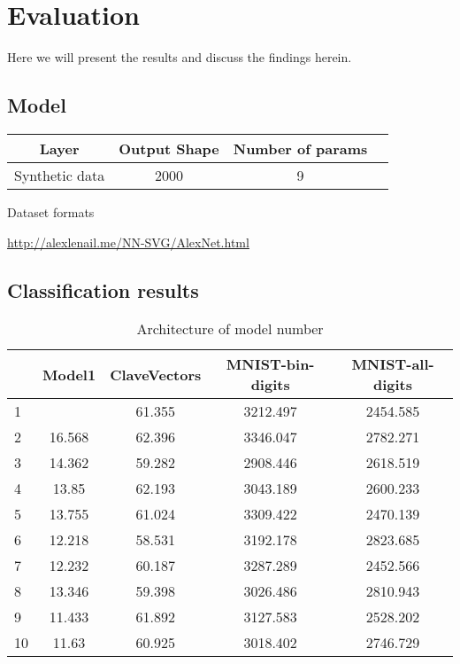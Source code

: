 \chapter{Evaluation}
Here we will present the results and discuss the findings herein.


\section{Model}
\begin{table}[H]
	\centering
	 \label{tab:title2} 
	\begin{tabular}{|c|c|c| c|} \hline
		\textbf{Layer} & \textbf{Output Shape } & \textbf{Number of params} \\ \hline \hline 
		Synthetic data & 2000 &  9  \\ \hline 

	\end{tabular}
	\par \bigskip Dataset formats
	\label{datasets}
\end{table}

\url{http://alexlenail.me/NN-SVG/AlexNet.html}

\section{Classification results}
\begin{table}[H]
	\centering
\begin{tabular}{|lcccc|}
	\hline
	\backslashbox{run \#}{Model}
&{Model1}&{ClaveVectors}&{MNIST-bin-digits}&{MNIST-all-digits} \\\hline\hline
	1 &  & 61.355 & 3212.497 & 2454.585 \\ \hline
	2 & 16.568 & 62.396 & 3346.047 & 2782.271 \\ \hline
	3 & 14.362 & 59.282 & 2908.446 & 2618.519 \\ \hline
	4 & 13.85 & 62.193 & 3043.189 &  2600.233 \\ \hline
	5 & 13.755 & 61.024 & 3309.422 & 2470.139 \\ \hline
	6 & 12.218 & 58.531 & 3192.178 & 2823.685 \\ \hline
	7 & 12.232 & 60.187 & 3287.289 & 2452.566 \\ \hline
	8 & 13.346 & 59.398 & 3026.486 & 2810.943 \\ \hline
	9 & 11.433 & 61.892 & 3127.583 & 2528.202 \\ \hline
	10 & 11.63 & 60.925 & 3018.402 & 2746.729 \\ \hline
\end{tabular}
	\caption{Architecture of model number}
\end{table}

